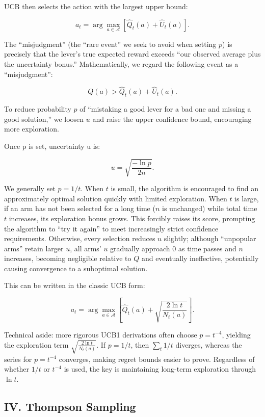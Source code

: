 UCB then selects the action with the largest upper bound:

\[
a_t=\arg\max_{a\in\mathcal{A}}[\hat{Q}_t(a)+\hat{U}_t(a)].
\]

The ``misjudgment'' (the ``rare event'' we seek to avoid when setting \(p\)) is precisely that the lever's true expected reward exceeds ``our observed average plus the uncertainty bonus.'' Mathematically, we regard the following event as a ``misjudgment'':

\[
Q(a)>\hat{Q}_t(a)+\hat{U}_t(a).
\]

To reduce probability \(p\) of ``mistaking a good lever for a bad one and missing a good solution,'' we loosen \(u\) and raise the upper confidence bound, encouraging more exploration.

Once p is set, uncertainty u is:

\[
u=\sqrt{\frac{-\ln p}{2n}}.
\]

We generally set \(p=1/t\). When \(t\) is small, the algorithm is encouraged to find an approximately optimal solution quickly with limited exploration. When \(t\) is large, if an arm has not been selected for a long time (\(n\) is unchanged) while total time \(t\) increases, its exploration bonus grows. This forcibly raises its score, prompting the algorithm to ``try it again'' to meet increasingly strict confidence requirements. Otherwise, every selection reduces \(u\) slightly; although ``unpopular arms'' retain larger \(u\), all arms' \(u\) gradually approach \(0\) as time passes and \(n\) increases, becoming negligible relative to \(Q\) and eventually ineffective, potentially causing convergence to a suboptimal solution.

This can be written in the classic UCB form:

\[
a_t=\arg\max_{a\in\mathcal{A}}[\hat{Q}_t(a)+\sqrt{\frac{2\ln t}{N_t(a)}}].
\]

Technical aside: more rigorous UCB1 derivations often choose \(p=t^{-4}\), yielding the exploration term \(\sqrt{\frac{2\ln t}{N_t(a)}}\). If \(p=1/t\), then \(\sum_t 1/t\) diverges, whereas the series for \(p=t^{-4}\) converges, making regret bounds easier to prove. Regardless of whether \(1/t\) or \(t^{-4}\) is used, the key is maintaining long-term exploration through \(\ln t\).

\hypertarget{iv.-thompson-sampling}{%
\subsection{IV. Thompson Sampling}\label{iv.-thompson-sampling}}

